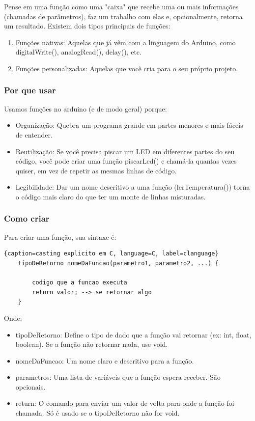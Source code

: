 \documentclass{report}
\begin{document}
	Pense em uma função como uma "caixa" que recebe uma ou mais informações (chamadas de parâmetros), faz um trabalho com elas e, opcionalmente, retorna um resultado. Existem dois tipos principais de funções:
	
	
	
	\begin{enumerate}
		\item Funções nativas: Aquelas que já vêm com a linguagem do Arduino, como digitalWrite(), analogRead(), delay(), etc.
		\item Funções personalizadas: Aquelas que você cria para o seu próprio projeto.
	\end{enumerate}
	\subsubsection{Por que usar}
	Usamos funções no arduino (e de modo geral) porque:
	
	\begin{itemize}
		\item Organização: Quebra um programa grande em partes menores e mais fáceis de entender.
		\item Reutilização: Se você precisa piscar um LED em diferentes partes do seu código, você pode criar uma função piscarLed() e chamá-la quantas vezes quiser, em vez de repetir as mesmas linhas de código.
		\item Legibilidade: Dar um nome descritivo a uma função (lerTemperatura()) torna o código mais claro do que ter um monte de linhas misturadas.
	\end{itemize}
	
	\subsubsection{Como criar}
	Para criar uma função, sua sintaxe é:
	
	\begin{center}
		
		\begin{lstlisting}{caption=casting explicito em C, language=C, label=clanguage}	
	tipoDeRetorno nomeDaFuncao(parametro1, parametro2, ...) {
		
		codigo que a funcao executa
		return valor; --> se retornar algo
	}
		\end{lstlisting}
	\end{center}
	
	Onde:
	
	\begin{itemize}
		\item tipoDeRetorno: Define o tipo de dado que a função vai retornar (ex: int, float, boolean). Se a função não retornar nada, use void.
		\item nomeDaFuncao: Um nome claro e descritivo para a função.
		\item parametros: Uma lista de variáveis que a função espera receber. São opcionais.
		\item return: O comando para enviar um valor de volta para onde a função foi chamada. Só é usado se o tipoDeRetorno não for void.
	\end{itemize}
	
\end{document}

